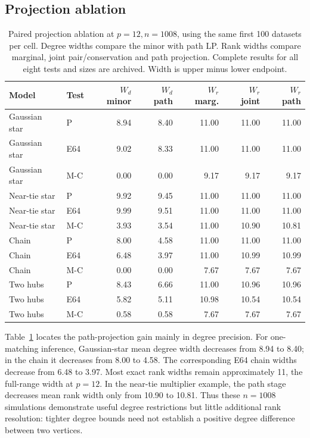\subsection{Projection ablation}
\begin{table}[htbp]\centering\small
\setlength{\tabcolsep}{4pt}
\caption{Paired projection ablation at $p=12,n=1008$, using the same first 100 datasets per cell. Degree widths compare the minor with path LP. Rank widths compare marginal, joint pair/conservation and path projection. Complete results for all eight tests and sizes are archived. Width is upper minus lower endpoint.}\label{tab:ablation}
\begin{lrbox}{\resultsbox}\begin{tabular}{llrrrrr}
\toprule
Model & Test & $W_d$ minor & $W_d$ path & $W_r$ marg. & $W_r$ joint & $W_r$ path\\
\midrule
Gaussian star & P & 8.94 & 8.40 & 11.00 & 11.00 & 11.00\\
Gaussian star & E64 & 9.02 & 8.33 & 11.00 & 11.00 & 11.00\\
Gaussian star & M-C & 0.00 & 0.00 & 9.17 & 9.17 & 9.17\\
Near-tie star & P & 9.92 & 9.45 & 11.00 & 11.00 & 11.00\\
Near-tie star & E64 & 9.99 & 9.51 & 11.00 & 11.00 & 11.00\\
Near-tie star & M-C & 3.93 & 3.54 & 11.00 & 10.90 & 10.81\\
Chain & P & 8.00 & 4.58 & 11.00 & 11.00 & 11.00\\
Chain & E64 & 6.48 & 3.97 & 11.00 & 10.99 & 10.99\\
Chain & M-C & 0.00 & 0.00 & 7.67 & 7.67 & 7.67\\
Two hubs & P & 8.43 & 6.66 & 11.00 & 10.96 & 10.96\\
Two hubs & E64 & 5.82 & 5.11 & 10.98 & 10.54 & 10.54\\
Two hubs & M-C & 0.58 & 0.58 & 7.67 & 7.67 & 7.67\\
\bottomrule\end{tabular}\end{lrbox}\ifdim\wd\resultsbox>\linewidth\resizebox{\linewidth}{!}{\usebox{\resultsbox}}\else\usebox{\resultsbox}\fi\end{table}
Table~\ref{tab:ablation} locates the path-projection gain mainly in degree precision. For one-matching inference, Gaussian-star mean degree width decreases from 8.94 to 8.40; in the chain it decreases from 8.00 to 4.58. The corresponding E64 chain widths decrease from 6.48 to 3.97. Most exact rank widths remain approximately 11, the full-range width at $p=12$. In the near-tie multiplier example, the path stage decreases mean rank width only from 10.90 to 10.81. Thus these $n=1008$ simulations demonstrate useful degree restrictions but little additional rank resolution: tighter degree bounds need not establish a positive degree difference between two vertices.

